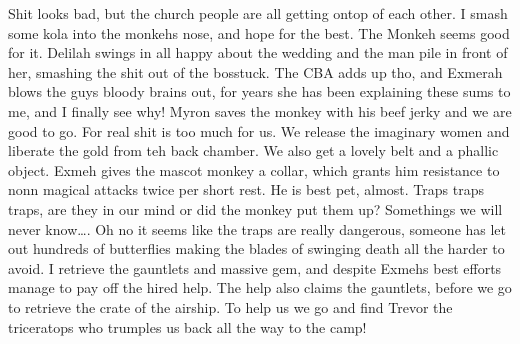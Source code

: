 Shit looks bad, but the church people are all getting ontop of each other. I smash some kola into the monkehs nose, and hope for the best. The Monkeh seems good for it. Delilah swings in all happy about the wedding and the man pile in front of her, smashing the shit out of the bosstuck. The CBA adds up tho, and Exmerah blows the guys bloody brains out, for years she has been explaining these sums to me, and I finally see why! Myron saves the monkey with his beef jerky and we are good to go.\medskip
For real shit is too much for us.\medskip
We release the imaginary women and liberate the gold from teh back chamber. We also get a lovely belt and a phallic object.\medskip
Exmeh gives the mascot monkey a collar, which grants him resistance to nonn magical attacks twice per short rest. He is best pet, almost.\medskip
Traps traps traps, are they in our mind or did the monkey put them up? Somethings we will never know….\medskip
Oh no it seems like the traps are really dangerous, someone has let out hundreds of butterflies making the blades of swinging death all the harder to avoid.\medskip
I retrieve the gauntlets and massive gem, and despite Exmehs best efforts manage to pay off the hired help. The help also claims the gauntlets, before we go to retrieve the crate of the airship.\medskip
To help us we go and find Trevor the triceratops who trumples us back all the way to the camp!\medskip